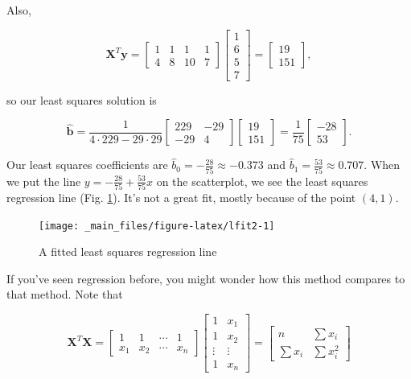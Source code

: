 \documentclass[
]{book}
\theoremstyle{definition}
\theoremstyle{definition}
\theoremstyle{definition}
\theoremstyle{definition}
\theoremstyle{remark}
\begin{document}
Also,

\[\mathbf{X}^T\mathbf{y}=\begin{bmatrix}1 & 1 & 1 & 1\\4 & 8 & 10 & 7\end{bmatrix}\begin{bmatrix}1\\6\\5\\7\end{bmatrix}=\begin{bmatrix}19\\151\end{bmatrix},\]

so our least squares solution is

\[\hat{\mathbf{b}}=\frac{1}{4\cdot229-29\cdot29}\begin{bmatrix}229 & -29\\-29 & 4\end{bmatrix}\begin{bmatrix}19\\151\end{bmatrix}=\frac{1}{75}\begin{bmatrix}-28\\53\end{bmatrix}.\]

Our least squares coefficients are \(\hat{b}_0=-\frac{28}{75}\approx -0.373\) and \(\hat{b}_1=\frac{53}{75}\approx0.707\). When we put the line \(y=-\frac{28}{75}+\frac{53}{75}x\) on the scatterplot, we see the least squares regression line (Fig. \ref{fig:lfit2}). It's not a great fit, mostly because of the point \((4,1).\)

\begin{figure}

{\centering \texttt{[image: \_main\_files/figure-latex/lfit2-1]} 

}

\caption{A fitted least squares regression line}\label{fig:lfit2}
\end{figure}

If you've seen regression before, you might wonder how this method compares to that method. Note that

\[\mathbf{X}^T\mathbf{X}=\begin{bmatrix}1 & 1 & \cdots & 1\\x_1 & x_2 & \cdots & x_n\end{bmatrix}\begin{bmatrix}1 & x_1\\1 & x_2\\\vdots & \vdots\\1 & x_n\end{bmatrix}=\begin{bmatrix} n & \sum x_i\\ \sum x_i & \sum x_i^2\end{bmatrix}\]
\end{document}
